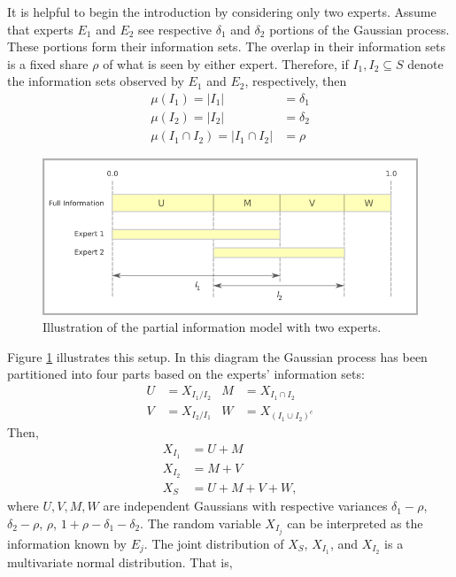 \documentclass[11pt]{article}
\theoremstyle{definition}
\theoremstyle{definition}
\begin{document}
It is helpful to begin the introduction by considering only two experts. Assume that experts $E_1$ and $E_2$ see respective $\delta_1$ and $\delta_2$ portions of the Gaussian process. These portions form their information sets. The overlap in their information sets is a fixed share $\rho$ of what is seen by either expert. Therefore, if $I_1, I_2 \subseteq S$ denote the information sets observed by $E_1$ and $E_2$, respectively, then
\begin{align*}
\mu(I_1) = |I_1| &= \delta_1\\
\mu(I_2) = |I_2| &= \delta_2\\
\mu(I_1 \cap I_2) =  |I_1 \cap I_2| &= \rho
\end{align*}
\begin{figure}[htbp]
   \includegraphics[width = \textwidth]{N=2} %
   \caption{Illustration of the partial information model with two experts.}
   \label{diagram2}
\end{figure}
Figure \ref{diagram2} illustrates this setup. In this diagram the Gaussian process has been partitioned into four parts based on the experts' information sets:
\begin{align*}
 U &= X_{I_1 / I_2}
& M &= X_{I_1 \cap I_2}\\
 V &= X_{I_2 / I_1}
& W &= X_{(I_1 \cup I_2)^c}
\end{align*}
Then,
\begin{align*}
X_{I_1} &= U + M\\
X_{I_2} &= M + V\\
X_S &= U+M+V+W,
\end{align*}
where $U, V, M, W$ are independent Gaussians with respective variances $\delta_1-\rho$, $\delta_2-\rho$, $\rho$, $1+\rho-\delta_1 - \delta_2$. The random variable $X_{I_j}$ can be interpreted as the information known by $E_j$. The joint distribution of $X_{S}$, $X_{I_1}$, and $X_{I_2}$ is a multivariate normal distribution. That is,
\end{document}
